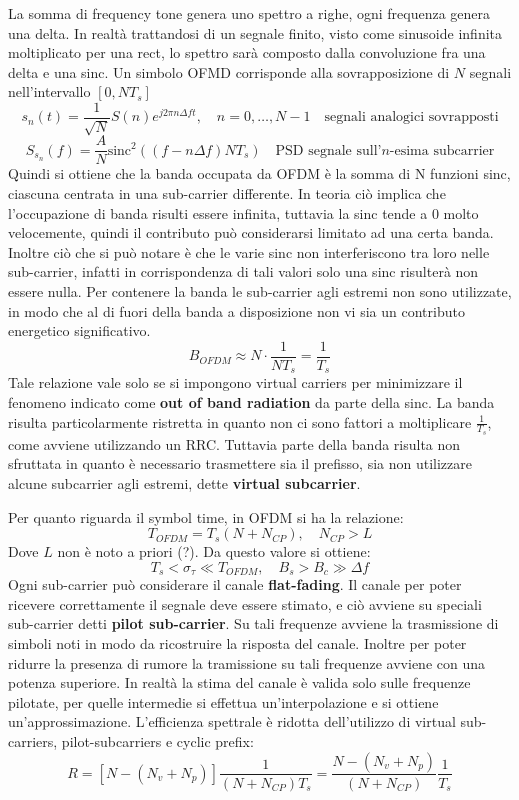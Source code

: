 La somma di frequency tone genera uno spettro a righe, ogni frequenza genera una delta. In realtà trattandosi di un segnale finito, visto come sinusoide infinita moltiplicato per una rect, lo spettro sarà composto dalla convoluzione fra una delta e una sinc.
Un simbolo OFMD corrisponde alla sovrapposizione di $N$ segnali nell'intervallo $[0, NT_s]$
\[
    s_n(t) = \frac{1}{\sqrt{N}} S(n) e^{j2\pi n \Delta f t}, \quad n = 0, \ldots, N-1 \quad \text{segnali analogici sovrapposti}
\]
\[
    S_{s_n}(f) = \frac{A}{N} \text{sinc}^2 ((f-n\Delta f)N T_s) \quad \text{PSD segnale sull'$n$-esima subcarrier}
\]
Quindi si ottiene che la banda occupata da OFDM è la somma di N funzioni sinc, ciascuna centrata in una sub-carrier differente. In teoria ciò implica che l'occupazione di banda risulti essere infinita, tuttavia la sinc tende a 0 molto velocemente, quindi il contributo può considerarsi limitato ad una certa banda. Inoltre ciò che si può notare è che le varie sinc non interferiscono tra loro nelle sub-carrier, infatti in corrispondenza di tali valori solo una sinc risulterà non essere nulla. Per contenere la banda le sub-carrier agli estremi non sono utilizzate, in modo che al di fuori della banda a disposizione non vi sia un contributo energetico significativo.
\[
    B_{OFDM} \approx N \cdot \frac{1}{NT_s} = \frac{1}{T_s}
\]
Tale relazione vale solo se si impongono virtual carriers per minimizzare il fenomeno indicato come \textbf{out of band radiation} da parte della sinc.
La banda risulta particolarmente ristretta in quanto non ci sono fattori a moltiplicare $\frac{1}{T_s}$, come avviene utilizzando un RRC. Tuttavia parte della banda risulta non sfruttata in quanto è necessario trasmettere sia il prefisso, sia non utilizzare alcune subcarrier agli estremi, dette \textbf{virtual subcarrier}.


Per quanto riguarda il symbol time, in OFDM si ha la relazione:
\[
    T_{OFDM} = T_s(N+N_{CP}), \quad N_{CP} > L
\]  
Dove $L$ non è noto a priori (?).
Da questo valore si ottiene:
\[
    T_s < \sigma_{\tau} \ll T_{OFDM}, \quad B_s > B_c \gg \Delta f
\]
Ogni sub-carrier può considerare il canale \textbf{flat-fading}. Il canale per poter ricevere correttamente il segnale deve essere stimato, e ciò avviene su speciali sub-carrier detti \textbf{pilot sub-carrier}. Su tali frequenze avviene la trasmissione di simboli noti in modo da ricostruire la risposta del canale. Inoltre per poter ridurre la presenza di rumore la tramissione su tali frequenze avviene con una potenza superiore. In realtà la stima del canale è valida solo sulle frequenze pilotate, per quelle intermedie si effettua un'interpolazione e si ottiene un'approssimazione.
L'efficienza spettrale è ridotta dell'utilizzo di virtual sub-carriers, pilot-subcarriers e cyclic prefix:
\[
    R = \left[N - (N_v + N_p) \right]\frac{1}{(N+N_{CP})T_s} = \frac{N - (N_v + N_p)}{(N+N_{CP})} \frac{1}{T_s}
\]

